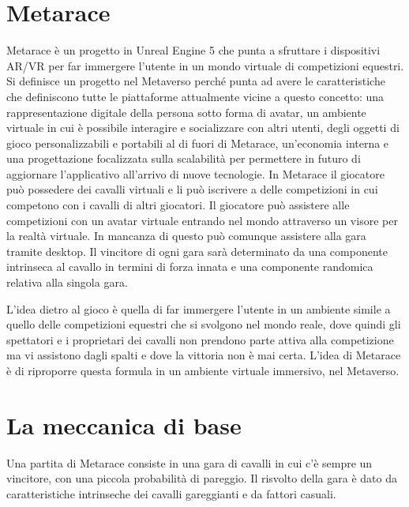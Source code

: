 
\section{Metarace}

    Metarace è un progetto in Unreal Engine 5 che punta a sfruttare i dispositivi AR/VR per far immergere l'utente in un mondo virtuale di competizioni equestri.
    Si definisce un progetto nel Metaverso perché punta ad avere le caratteristiche che definiscono tutte le piattaforme attualmente vicine a questo concetto: una rappresentazione digitale della persona sotto forma di avatar, un ambiente virtuale in cui è possibile interagire e socializzare con altri utenti, degli oggetti di gioco personalizzabili e portabili al di fuori di Metarace, un'economia interna e una progettazione focalizzata sulla scalabilità per permettere in futuro di aggiornare l'applicativo all'arrivo di nuove tecnologie.
    In Metarace il giocatore può possedere dei cavalli virtuali e li può iscrivere a delle competizioni in cui competono con i cavalli di altri giocatori.
    Il giocatore può assistere alle competizioni con un avatar virtuale entrando nel mondo attraverso un visore per la realtà virtuale. 
    In mancanza di questo può comunque assistere alla gara tramite desktop. 
    Il vincitore di ogni gara sarà determinato da una componente intrinseca al cavallo in termini di forza innata e una componente randomica relativa alla singola gara.

    L'idea dietro al gioco è quella di far immergere l'utente in un ambiente simile a quello delle competizioni equestri che si svolgono nel mondo reale, dove quindi gli spettatori e i proprietari dei cavalli non prendono parte attiva alla competizione ma vi assistono dagli spalti e dove la vittoria non è mai certa. 
    L'idea di Metarace è di riproporre questa formula in un ambiente virtuale immersivo, nel Metaverso.

\section{La meccanica di base} \label{sec:Meccanica}

    Una partita di Metarace consiste in una gara di cavalli in cui c'è sempre un vincitore, con una piccola probabilità di pareggio.
    Il risvolto della gara è dato da caratteristiche intrinseche dei cavalli gareggianti e da fattori casuali.

